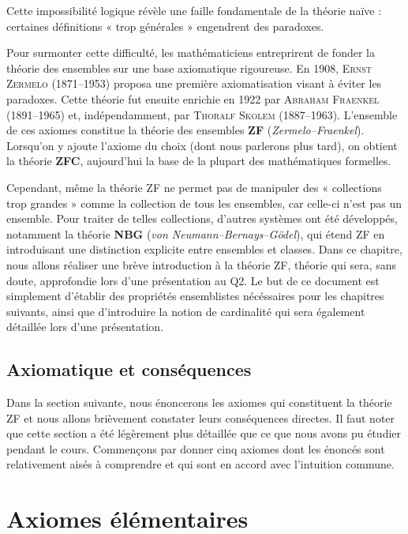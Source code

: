 Cette impossibilité logique révèle une faille fondamentale de la théorie naïve : certaines définitions « trop générales » engendrent des paradoxes.

\medskip

Pour surmonter cette difficulté, les mathématiciens entreprirent de fonder la théorie des ensembles sur une base axiomatique rigoureuse.
En 1908, \textsc{Ernst Zermelo} (1871–1953) proposa une première axiomatisation visant à éviter les paradoxes.
Cette théorie fut ensuite enrichie en 1922 par \textsc{Abraham Fraenkel} (1891–1965) et, indépendamment, par \textsc{Thoralf Skolem} (1887–1963).
L’ensemble de ces axiomes constitue la théorie des ensembles \textbf{ZF} (\emph{Zermelo–Fraenkel}).
Lorsqu’on y ajoute l’axiome du choix (dont nous parlerons plus tard), on obtient la théorie \textbf{ZFC}, aujourd’hui la base de la plupart des mathématiques formelles.

\medskip

Cependant, même la théorie ZF ne permet pas de manipuler des « collections trop grandes » comme la collection de tous les ensembles, car celle-ci n'est pas un ensemble.
Pour traiter de telles collections, d’autres systèmes ont été développés, notamment la théorie \textbf{NBG} (\emph{von Neumann–Bernays–Gödel}), qui étend ZF en introduisant une distinction explicite entre ensembles et classes.
Dans ce chapitre, nous allons réaliser une brève introduction à la théorie ZF, théorie qui sera, sans doute, approfondie lors d'une présentation au Q2. Le but de ce document est simplement d'établir des propriétés ensemblistes nécéssaires pour les chapitres suivants, ainsi que d'introduire la notion de cardinalité qui sera également détaillée lors d'une présentation.

\subsection{Axiomatique et conséquences}

Dans la section suivante, nous énoncerons les axiomes qui constituent la théorie ZF et nous allons brièvement constater leurs conséquences directes. Il faut noter que cette section a été légèrement plus détaillée que ce que nous avons pu étudier pendant le cours.
Commençons par donner cinq axiomes dont les énoncés sont relativement aisés à comprendre et qui sont en accord avec l'intuition commune.

\section*{Axiomes élémentaires}

